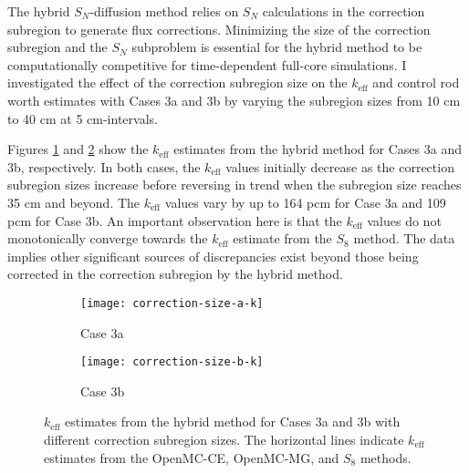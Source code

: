 The hybrid $S_N$-diffusion method relies on $S_N$ calculations in the correction subregion to
generate flux corrections. Minimizing the size of the correction subregion and the $S_N$ subproblem
is essential for the hybrid method to be computationally competitive for time-dependent full-core
simulations. I investigated the effect of the correction subregion size on the $k_\text{eff}$ and
control rod worth estimates with Cases 3a and 3b by varying the subregion sizes from 10 cm to 40 cm
at 5 cm-intervals.

Figures \ref{fig:v1-size-a-k} and \ref{fig:v1-size-b-k} show the $k_\text{eff}$ estimates from the
hybrid method for Cases 3a and 3b, respectively. In both cases, the $k_\text{eff}$ values initially
decrease as the correction subregion sizes increase before reversing in trend when the subregion
size reaches 35 cm and beyond. The $k_\text{eff}$ values vary by up to 164 pcm for Case 3a and 109
pcm for Case 3b. An important observation here is that the $k_\text{eff}$ values do not
monotonically converge towards the $k_\text{eff}$ estimate from the $S_8$ method. The data implies
other significant sources of discrepancies exist beyond those being corrected in the
correction subregion by the hybrid method.


\begin{figure}[htb!]
  \centering
  \begin{subfigure}[b]{0.49\columnwidth}
    \centering
    \texttt{[image: correction-size-a-k]}
    \caption{Case 3a}
    \label{fig:v1-size-a-k}
  \end{subfigure}
  \hfill
  \begin{subfigure}[b]{0.49\columnwidth}
    \centering
    \texttt{[image: correction-size-b-k]}
    \caption{Case 3b}
    \label{fig:v1-size-b-k}
  \end{subfigure}
  \caption{$k_\text{eff}$ estimates from the hybrid method for Cases 3a and 3b with different
  correction subregion sizes. The horizontal lines indicate $k_\text{eff}$ estimates from the
  OpenMC-CE, OpenMC-MG, and $S_8$ methods.}
  \label{fig:v1-size-k}
\end{figure}

